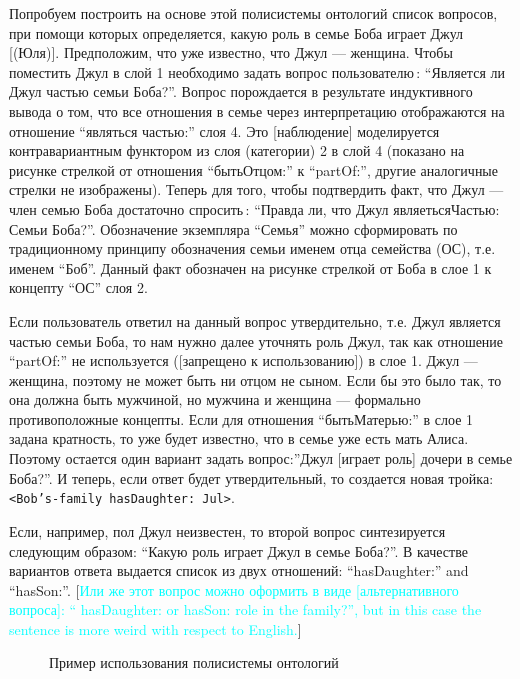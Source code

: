 \documentclass[utf8]{../IncArticle}
\newcommand{\e}[2][fcolor]{\textcolor{pcolor}{[}\textcolor{#1}{#2}\textcolor{pcolor}{]}}
\begin{document}
Попробуем построить на основе этой полисистемы онтологий список
вопросов, при помощи которых определяется, какую роль в семье Боба
играет Джул \e{(Юля)}.  Предположим, что уже известно, что Джул ---
женщина.  Чтобы поместить Джул в слой 1 необходимо задать вопрос
пользователю\,: ``Является ли Джул частью семьи Боба?''.  Вопрос
порождается в результате индуктивного вывода о том, что все отношения
в семье через интерпретацию отображаются на отношение ``являться
частью:'' слоя 4.  Это \e{наблюдение} моделируется контравариантным
функтором из слоя (категории) 2 в слой 4 (показано на рисунке
стрелкой от отношения ``бытьОтцом:'' к ``partOf:'', другие аналогичные
стрелки не изображены).  Теперь для того, чтобы подтвердить факт, что
Джул --- член семью Боба достаточно спросить\,: ``Правда ли, что Джул
являетьсяЧастью: Семьи Боба?''.  Обозначение экземпляра ``Семья''
можно сформировать по традиционному принципу обозначения семьи именем
отца семейства (ОС), т.е. именем ``Боб''.  Данный факт обозначен на
рисунке стрелкой от Боба в слое 1 к концепту ``ОС'' слоя 2.

Если пользователь ответил на данный вопрос утвердительно, т.е. Джул
является частью семьи Боба, то нам нужно далее уточнять роль Джул, так
как отношение ``partOf:'' не используется (\e{запрещено к
  использованию}) в слое 1.  Джул --- женщина, поэтому не может быть
ни отцом не сыном. Если бы это было так, то она должна быть мужчиной,
но мужчина и женщина --- формально противоположные концепты.  Если для
отношения ``бытьМатерью:'' в слое 1 задана кратность, то уже будет
известно, что в семье уже есть мать Алиса.  Поэтому остается один
вариант задать вопрос:''Джул [играет роль] дочери в семье Боба?''.  И
теперь, если ответ будет утвердительный, то создается новая тройка: \texttt{<Bob's-family hasDaughter: Jul>}.

Если, например, пол Джул неизвестен, то второй вопрос синтезируется
следующим образом: ``Какую роль играет Джул в семье Боба?''.  В
качестве вариантов ответа выдается список из двух отношений:
``hasDaughter:'' and ``hasSon:''.  \e[cyan]{Или же этот вопрос можно оформить в
виде \e{альтернативного вопроса}: `` hasDaughter: or hasSon: role in the family?'', but in this case the sentence is more weird with respect to English.}

\begin{figure}
\begin{center}
\sf
\def\svgwidth{0.7\linewidth}

\end{center}
\caption{Пример использования полисистемы онтологий}
\label{OPSA}
\end{figure}
\end{document}
